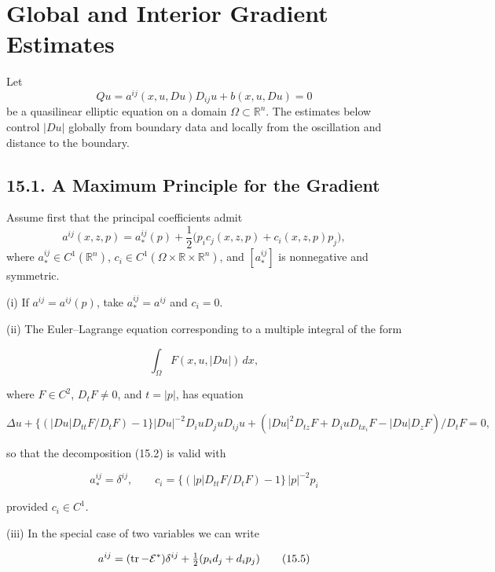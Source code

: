 \chapter{Global and Interior Gradient Estimates}

Let
\begin{equation}\tag{15.1}
Qu=a^{ij}(x,u,Du)D_{ij}u+b(x,u,Du)=0
\end{equation}
be a quasilinear elliptic equation on a domain $\Omega\subset\mathbb R^n$.
The estimates below control $|Du|$ globally from boundary data and locally from
the oscillation and distance to the boundary.

\section*{15.1. A Maximum Principle for the Gradient}

Assume first that the principal coefficients admit
\begin{equation}\tag{15.2}
a^{ij}(x,z,p)=a_*^{ij}(p)
+
\frac12\bigl(p_ic_j(x,z,p)+c_i(x,z,p)p_j\bigr),
\end{equation}
where $a_*^{ij}\in C^1(\mathbb R^n)$,
$c_i\in C^1(\Omega\times\mathbb R\times\mathbb R^n)$, and
$[a_*^{ij}]$ is nonnegative and symmetric.


(i) If \(a^{ij}=a^{ij}(p)\), take \(a_*^{ij}=a^{ij}\) and \(c_i=0\).

(ii) The Euler--Lagrange equation corresponding to a multiple integral of the form

\begin{equation}
\int_{\Omega} F(x,u,|Du|)\,dx,
\tag{15.3}
\end{equation}

where \(F\in C^2\), \(D_tF\ne0\), and \(t=|p|\), has equation

\begin{equation}
\Delta u+\{(|Du|D_{tt}F/D_tF)-1\}|Du|^{-2}D_i u D_j u D_{ij}u
+ (|Du|^2D_{tz}F + D_i u D_{tx_i}F - |Du|D_zF)/D_tF=0,
\tag{15.4}
\end{equation}

so that the decomposition (15.2) is valid with

\[
a_*^{ij}=\delta^{ij},\qquad c_i=\{(|p|D_{tt}F/D_tF)-1\}\,|p|^{-2}p_i
\]

provided \(c_i\in C^1\).

(iii) In the special case of two variables we can write

\begin{equation}
 a^{ij}=(\operatorname{tr}-\mathcal{E}^{*})\delta^{ij}+\tfrac12(p_i d_j+d_i p_j)
\tag{15.5}
\end{equation}

